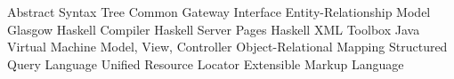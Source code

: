 \begin{acronym}[XXXX]
 {Abstract Syntax Tree}
 {Common Gateway Interface}
 {Entity-Relationship Model}
 {Glasgow Haskell Compiler}
 {Haskell Server Pages}
 {Haskell XML Toolbox}
 {Java Virtual Machine}
 {Model, View, Controller}
 {Object-Relational Mapping}
 {Structured Query Language}
 {Unified Resource Locator}
 {Extensible Markup Language}
\end{acronym}
\cleardoublepage